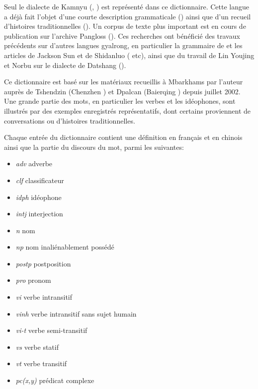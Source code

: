Seul le dialecte de Kamnyu (, ) est représenté dans ce dictionnaire. Cette langue a déjà fait l'objet d'une courte description grammaticale (\citealt{jacques08}) ainsi que d'un recueil d'histoires traditionnelles (\citealt{jacques10gesar}). Un corpus de texte plus important est en cours de publication sur l'archive Pangloss (\citealt{michailovsky14pangloss}). Ces recherches ont bénéficié des travaux précédents sur d'autres langues gyalrong, en particulier la grammaire de \citet{linxr93jiarong} et les articles de Jackson Sun et de Shidanluo (\citealt{jackson00sidaba, jackson04zhuangmaoci, jackson06paisheng, jackson14morpho} etc), ainsi que du travail de Lin Youjing et Norbu sur le dialecte de Datshang (\citealt{linluo03}).

Ce dictionnaire est basé sur les matériaux recueillis à Mbarkhams par l'auteur auprès de Tshendzin (Chenzhen ) et Dpalcan (Baierqing ) depuis juillet 2002. Une grande partie des mots, en particulier les verbes et les idéophones, sont illustrés par des exemples enregistrés représentatifs, dont certains proviennent de conversations ou d'histoires traditionnelles.

Chaque entrée du dictionnaire contient une définition en français et en chinois ainsi que la partie du discours du mot, parmi les suivantes:

\begin{itemize}
\item \textit{adv} adverbe
\item \textit{clf} classificateur
\item \textit{idph} idéophone
\item \textit{intj} interjection
\item \textit{n} nom
\item \textit{np} nom inaliénablement possédé 
\item \textit{postp} postposition
\item \textit{pro} pronom
\item \textit{vi} verbe intransitif
\item \textit{vinh} verbe intransitif sans sujet humain
\item \textit{vi-t} verbe semi-transitif
\item \textit{vs} verbe statif
\item \textit{vt} verbe transitif
\item \textit{pc(x,y)} prédicat complexe 
\end{itemize}

